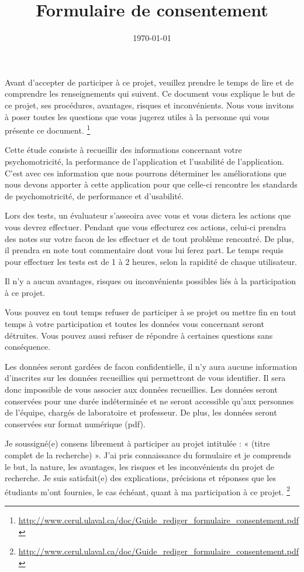 \documentclass[12pt,a4paper,oneside]{article}
\begin{document}
\title{Formulaire de consentement}
\date{\today}
\maketitle

Avant d’accepter de participer à ce projet, veuillez prendre le temps de lire et de comprendre les renseignements qui suivent. Ce document vous explique le but de ce projet, ses procédures, avantages, risques et inconvénients. Nous vous invitons à poser toutes les questions que vous jugerez utiles à la personne qui vous présente ce document. \footnote{\url{http://www.cerul.ulaval.ca/doc/Guide_rediger_formulaire_consentement.pdf}}

Cette étude consiste à recueillir des informations concernant votre psychomotricité, la performance de l'application et l'usabilité de l'application. C'est avec ces information que nous pourrons déterminer les améliorations que nous devons apporter à cette application pour que celle-ci rencontre les standards de psychomotricité, de performance et d'usabilité.

Lors des tests, un évaluateur s'asseoira avec vous et vous dictera les actions que vous devrez effectuer. Pendant que vous effecturez ces actions, celui-ci prendra des notes sur votre facon de les effectuer et de tout problème rencontré. De plus, il prendra en note tout commentaire dont vous lui ferez part. Le temps requis pour effectuer les tests est de 1 à 2 heures, selon la rapidité de chaque utilisateur.

Il n'y a aucun avantages, risques ou inconvénients possibles liés à la participation à ce projet.

Vous pouvez en tout temps refuser de participer à se projet ou mettre fin en tout temps à votre participation et toutes les données vous concernant seront détruites. Vous pouvez aussi refuser de répondre à certaines questions sans conséquence.

Les données seront gardées de facon confidentielle, il n'y aura aucune information d'inscrites sur les données recueillies qui permettront de vous identifier. Il sera donc impossible de vous associer aux données recueillies. Les données seront conservées pour une durée indéterminée et ne seront accessible qu'aux personnes de l'équipe, chargés de laboratoire et professeur. De plus, les données seront conservées sur format numérique (pdf).

\newpage

Je soussigné(e) \underline{\hspace{4.5cm}} consens librement à participer au projet intitulée : « (titre complet de la recherche) ». J’ai pris connaissance du formulaire et je comprends le but, la nature, les avantages, les risques et les inconvénients du projet de recherche. Je suis satisfait(e) des explications, précisions et réponses que les étudiants m’ont fournies, le cas échéant, quant à ma participation à ce projet. \footnote{\url{http://www.cerul.ulaval.ca/doc/Guide_rediger_formulaire_consentement.pdf}}
\end{document}
